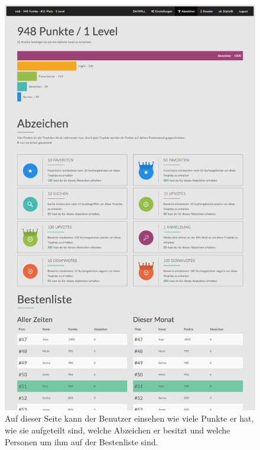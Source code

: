 \documentclass[12pt,twoside]{book}
\begin{document}
\begin{figure}[htbp]
    \centering
    \includegraphics[width=1.0\textwidth]{images/infoboard_usersite.png}
    \caption{Auf dieser Seite kann der Benutzer einsehen wie viele Punkte er hat, wie sie aufgeteilt sind, welche Abzeichen er besitzt und welche Personen um ihm auf der Bestenliste sind. }
    \label{fig:usersite}
\end{figure}
\end{document}

